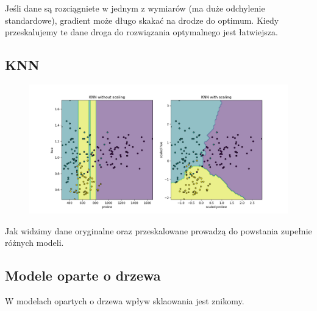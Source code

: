\documentclass{article}
\begin{document}
Jeśli dane są rozciągniete w jednym z wymiarów (ma duże odchylenie standardowe), gradient może długo skakać na drodze do optimum. Kiedy przeskalujemy te dane droga do rozwiązania optymalnego jest łatwiejsza.

\subsection{KNN}

\begin{figure}[H]
    \centering
    \includegraphics[scale=0.5]{knn.png}
\end{figure}

Jak widzimy dane oryginalne oraz przeskalowane prowadzą do powstania zupełnie różnych modeli.

\subsection{Modele oparte o drzewa}

W modelach opartych o drzewa wpływ sklaowania jest znikomy.
\end{document}
